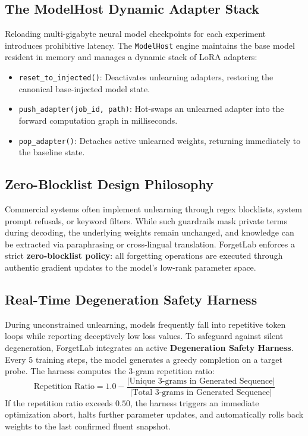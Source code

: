 \documentclass[11pt,a4paper]{article}
\begin{document}
\subsection{The ModelHost Dynamic Adapter Stack}
Reloading multi-gigabyte neural model checkpoints for each experiment introduces prohibitive latency. The \texttt{ModelHost} engine maintains the base model resident in memory and manages a dynamic stack of LoRA adapters:
\begin{itemize}
    \item \texttt{reset\_to\_injected()}: Deactivates unlearning adapters, restoring the canonical base-injected model state.
    \item \texttt{push\_adapter(job\_id, path)}: Hot-swaps an unlearned adapter into the forward computation graph in milliseconds.
    \item \texttt{pop\_adapter()}: Detaches active unlearned weights, returning immediately to the baseline state.
\end{itemize}

\subsection{Zero-Blocklist Design Philosophy}
Commercial systems often implement unlearning through regex blocklists, system prompt refusals, or keyword filters. While such guardrails mask private terms during decoding, the underlying weights remain unchanged, and knowledge can be extracted via paraphrasing or cross-lingual translation. ForgetLab enforces a strict \textbf{zero-blocklist policy}: all forgetting operations are executed through authentic gradient updates to the model's low-rank parameter space.

\subsection{Real-Time Degeneration Safety Harness}
During unconstrained unlearning, models frequently fall into repetitive token loops while reporting deceptively low loss values. To safeguard against silent degeneration, ForgetLab integrates an active \textbf{Degeneration Safety Harness}. Every 5 training steps, the model generates a greedy completion on a target probe. The harness computes the 3-gram repetition ratio:
\begin{equation}
    \text{Repetition Ratio} = 1.0 - \frac{|\text{Unique 3-grams in Generated Sequence}|}{|\text{Total 3-grams in Generated Sequence}|}
\end{equation}
If the repetition ratio exceeds $0.50$, the harness triggers an immediate optimization abort, halts further parameter updates, and automatically rolls back weights to the last confirmed fluent snapshot.
\end{document}

